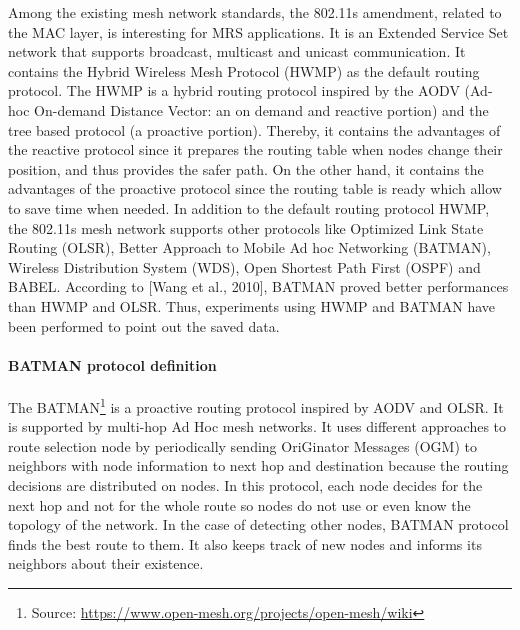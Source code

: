 \documentclass[11pt,openany]{book}
\begin{document}
Among the existing mesh network standards, the 802.11s amendment, related to the MAC layer, is interesting for MRS applications. It is an Extended Service Set network that supports broadcast, multicast and unicast communication. It contains the Hybrid Wireless Mesh Protocol (HWMP) as the default routing protocol. The HWMP is a hybrid routing protocol inspired by the AODV (Ad-hoc On-demand Distance Vector: an on demand and reactive portion) and the tree based protocol (a proactive portion). Thereby, it contains the advantages of the reactive protocol since it prepares the routing table when nodes change their position, and thus provides the safer path. On the other hand, it contains the advantages of the proactive protocol since the routing table is ready which allow to save time when needed. In addition to the default routing protocol HWMP, the 802.11s mesh network supports other protocols like Optimized Link State Routing (OLSR), Better Approach to Mobile Ad hoc Networking (BATMAN), Wireless Distribution System (WDS), Open Shortest Path First (OSPF) and BABEL. According to [Wang et al., 2010], BATMAN proved better performances than HWMP and OLSR. Thus, experiments using HWMP and BATMAN have been performed to point out the saved data.
\paragraph{BATMAN protocol  definition}
The BATMAN\footnote{Source: \url{https://www.open-mesh.org/projects/open-mesh/wiki}} is a proactive routing protocol inspired by AODV and OLSR. It is supported by multi-hop Ad Hoc mesh networks. It uses diﬀerent approaches to route selection node by periodically sending OriGinator Messages (OGM) to neighbors with node information to next hop and destination because the routing decisions are distributed on nodes. In this protocol, each node decides for the next hop and not for the whole route so nodes do not use or even know the topology of the network. In the case of detecting other nodes, BATMAN protocol ﬁnds the best route to them. It also keeps track of new nodes and informs its neighbors about their existence.
\end{document}
